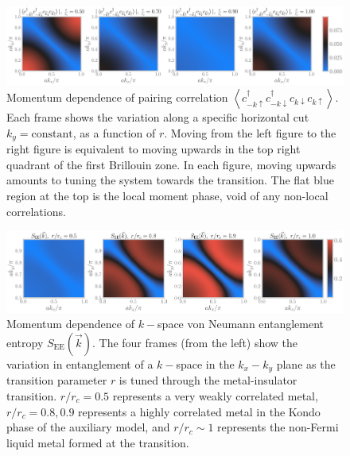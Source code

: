 \documentclass[prb]{revtex4-2}
\begin{document}
\begin{figure}[!htb]
\includegraphics[width=\textwidth]{pair_rspace_all.pdf}
\caption{Momentum dependence of pairing correlation \(\left<c^\dagger_{-k\uparrow}c^\dagger_{-k\downarrow}c_{k\downarrow}c_{k\uparrow}\right>\). Each frame shows the variation along a specific horizontal cut \(k_y=\text{constant}\), as a function of \(r\). Moving from the left figure to the right figure is equivalent to moving upwards in the top right quadrant of the first Brillouin zone. In each figure, moving upwards amounts to tuning the system towards the transition. The flat blue region at the top is the local moment phase, void of any non-local correlations.}
\label{pair_kspace}
\end{figure}

\begin{figure}[!htb]
\includegraphics[width=\textwidth]{vne_kspace_all.pdf}
\caption{Momentum dependence of \(k-\)space von Neumann entanglement entropy \(S_\text{EE}(\vec k)\). The four frames (from the left) show the variation in entanglement of a \(k-\)space in the \(k_x-k_y\) plane as the transition parameter \(r\) is tuned through the metal-insulator transition. \(r/r_c=0.5\) represents a very weakly correlated metal, \(r/r_c=0.8,0.9\) represents a highly correlated metal in the Kondo phase of the auxiliary model, and \(r/r_c \sim 1\) represents the non-Fermi liquid metal formed at the transition.}
\label{entanglement_kspace}
\end{figure}
\end{document}

